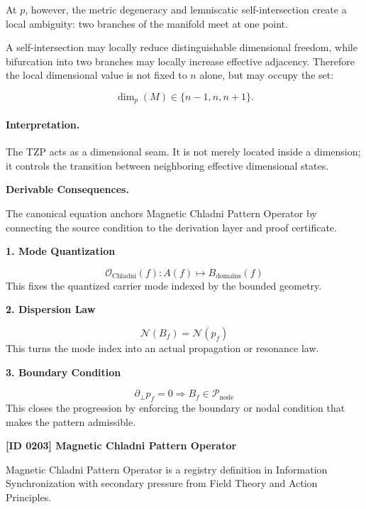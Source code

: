At $p$, however, the metric degeneracy and lemniscatic self-intersection create a local ambiguity: two branches of the manifold meet at one point.

A self-intersection may locally reduce distinguishable dimensional freedom, while bifurcation into two branches may locally increase effective adjacency. Therefore the local dimensional value is not fixed to $n$ alone, but may occupy the set:

\begin{equation}
\dim_p(M)\in\{n-1,n,n+1\}.
\end{equation}

\paragraph{Interpretation.}
The TZP acts as a dimensional seam. It is not merely located inside a dimension; it controls the transition between neighboring effective dimensional states.

\par\vspace{0.35em}
\noindent\textbf{Derivable Consequences.}\quad
\begingroup
\footnotesize
\raggedright
The canonical equation anchors Magnetic Chladni Pattern Operator by connecting the source condition to the derivation layer and proof certificate.
\par\endgroup

\noindent\textbf{1. Mode Quantization}\par
\[
\mathcal{O}_{\mathrm{Chladni}}(f):A(f)\mapsto B_{\mathrm{domains}}(f)
\]
\noindent This fixes the quantized carrier mode indexed by the bounded geometry.\par
\noindent\textbf{2. Dispersion Law}\par
\[
\mathcal{N}(B_f)=\mathcal{N}(p_f)
\]
\noindent This turns the mode index into an actual propagation or resonance law.\par
\noindent\textbf{3. Boundary Condition}\par
\[
\partial_{\perp}p_f=0\Rightarrow B_f\in\mathcal{P}_{\mathrm{node}}
\]
\noindent This closes the progression by enforcing the boundary or nodal condition that makes the pattern admissible.\par

\clearpage
\noindent\textbf{[ID 0203] Magnetic Chladni Pattern Operator}\par
\vspace{0.35em}
\begingroup\small
{}
Magnetic Chladni Pattern Operator is a registry definition in Information Synchronization with secondary pressure from Field Theory and Action Principles.

